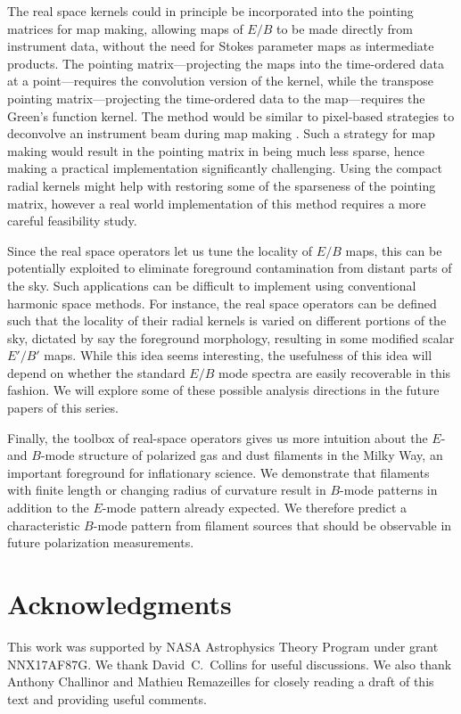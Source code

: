 \documentclass[a4paper,11pt]{article}
\begin{document}
The real space kernels could in principle be incorporated into the pointing matrices for map making, allowing maps of $E/B$ to be made directly from instrument data, without the need for Stokes parameter maps as intermediate products. The pointing matrix---projecting the maps into the time-ordered data at a point---requires the convolution version of the kernel, while the transpose pointing matrix---projecting the time-ordered data to the map---requires the Green's function kernel. The method would be similar to pixel-based strategies to deconvolve an instrument beam during map making \citep[e.g.][]{2010ApJS..187..212C}. Such a strategy for map making would result in the pointing matrix in being much less sparse, hence making a practical implementation significantly challenging. Using the compact radial kernels might help with restoring some of the sparseness of the pointing matrix, however a real world implementation of this method requires a more careful feasibility study.
 
Since the real space operators let us tune the locality of $E/B$ maps, this can be potentially exploited to eliminate foreground contamination from distant parts of the sky. Such applications can be difficult to implement using conventional harmonic space methods.  For instance, the real space operators can be defined such that the locality of their radial kernels is varied on different portions of the sky, dictated by say the foreground morphology, resulting in some modified scalar $E'/B'$ maps.  While this idea seems interesting, the usefulness of this idea will depend on whether the standard $E/B$ mode spectra are easily recoverable in this fashion.  We will explore some of these possible analysis directions in the future papers of this series.

Finally, the toolbox of real-space operators gives us more intuition about the $E$- and $B$-mode structure of polarized gas and dust filaments in the Milky Way, an important foreground for inflationary science. We demonstrate that filaments with finite length or changing radius of curvature result in $B$-mode patterns in addition to the $E$-mode pattern already expected.  We therefore predict a characteristic $B$-mode pattern from filament sources that should be observable in future polarization measurements.
%
\section*{Acknowledgments}

This work was supported by NASA Astrophysics Theory Program under grant NNX17AF87G.  We thank David~C.~Collins for useful discussions.  We also thank Anthony Challinor and Mathieu Remazeilles for closely reading a draft of this text and providing useful comments.
\endgroup



  
\end{document}
